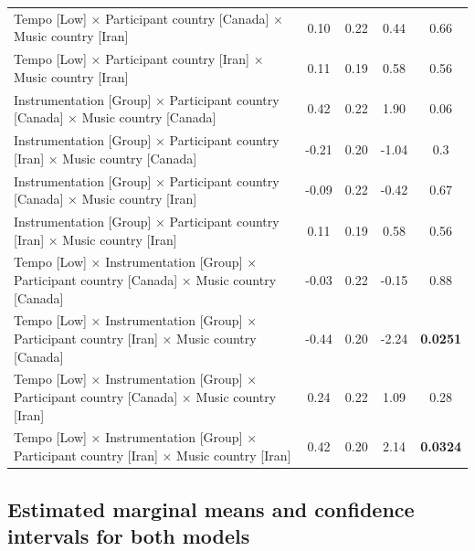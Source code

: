 \documentclass[
  bookmarksnumbered]{article}
\begin{document}
\begin{table}[H]
{\begin{tabular}[t]{lcccc}
\hspace{1em}Tempo [Low] × Participant country [Canada] × Music country [Iran] & 0.10 & 0.22 & 0.44 & 0.66\\
\hspace{1em}Tempo [Low] × Participant country [Iran] × Music country [Iran] & 0.11 & 0.19 & 0.58 & 0.56\\
\hspace{1em}Instrumentation [Group] × Participant country [Canada] × Music country [Canada] & 0.42 & 0.22 & 1.90 & 0.06\\
\hspace{1em}Instrumentation [Group] × Participant country [Iran] × Music country [Canada] & -0.21 & 0.20 & -1.04 & 0.3\\
\hspace{1em}Instrumentation [Group] × Participant country [Canada] × Music country [Iran] & -0.09 & 0.22 & -0.42 & 0.67\\
\hspace{1em}Instrumentation [Group] × Participant country [Iran] × Music country [Iran] & 0.11 & 0.19 & 0.58 & 0.56\\
\hspace{1em}Tempo [Low] × Instrumentation [Group] × Participant country [Canada] × Music country [Canada] & -0.03 & 0.22 & -0.15 & 0.88\\
\hspace{1em}Tempo [Low] × Instrumentation [Group] × Participant country [Iran] × Music country [Canada] & -0.44 & 0.20 & -2.24 & \textbf{0.0251}\\
\hspace{1em}Tempo [Low] × Instrumentation [Group] × Participant country [Canada] × Music country [Iran] & 0.24 & 0.22 & 1.09 & 0.28\\
\hspace{1em}Tempo [Low] × Instrumentation [Group] × Participant country [Iran] × Music country [Iran] & 0.42 & 0.20 & 2.14 & \textbf{0.0324}\\
\bottomrule
\end{tabular}}
\end{table}

\hypertarget{estimated-marginal-means-and-confidence-intervals-for-both-models}{%
\subsection{Estimated marginal means and confidence intervals for both models}\label{estimated-marginal-means-and-confidence-intervals-for-both-models}}
\end{document}
